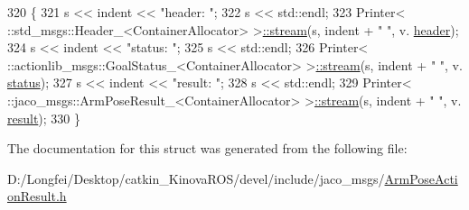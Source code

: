 \begin{DoxyCode}
320   \{
321     s << indent << \textcolor{stringliteral}{"header: "};
322     s << std::endl;
323     Printer< ::std\_msgs::Header\_<ContainerAllocator> >\hyperlink{structros_1_1message__operations_1_1Printer_3_01_1_1jaco__msgs_1_1ArmPoseActionResult___3_01ContainerAllocator_01_4_01_4_a567f70f23cdc780729ce2af5abe4f73f}{::stream}(s, indent + \textcolor{stringliteral}{"  "}, v.
      \hyperlink{structjaco__msgs_1_1ArmPoseActionResult___ad9fc777cd6615aa01e98c2c463ea8cfe}{header});
324     s << indent << \textcolor{stringliteral}{"status: "};
325     s << std::endl;
326     Printer< ::actionlib\_msgs::GoalStatus\_<ContainerAllocator> >\hyperlink{structros_1_1message__operations_1_1Printer_3_01_1_1jaco__msgs_1_1ArmPoseActionResult___3_01ContainerAllocator_01_4_01_4_a567f70f23cdc780729ce2af5abe4f73f}{::stream}(s, indent + \textcolor{stringliteral}{"  "}, v.
      \hyperlink{structjaco__msgs_1_1ArmPoseActionResult___a8c41477e86f3e0e82044b11667eb0e8f}{status});
327     s << indent << \textcolor{stringliteral}{"result: "};
328     s << std::endl;
329     Printer< ::jaco\_msgs::ArmPoseResult\_<ContainerAllocator> >\hyperlink{structros_1_1message__operations_1_1Printer_3_01_1_1jaco__msgs_1_1ArmPoseActionResult___3_01ContainerAllocator_01_4_01_4_a567f70f23cdc780729ce2af5abe4f73f}{::stream}(s, indent + \textcolor{stringliteral}{"  "}, v.
      \hyperlink{structjaco__msgs_1_1ArmPoseActionResult___a9bb1ef2f47899c230eaa740ee2df5b09}{result});
330   \}
\end{DoxyCode}


The documentation for this struct was generated from the following file\+:\begin{DoxyCompactItemize}
\item 
D\+:/\+Longfei/\+Desktop/catkin\+\_\+\+Kinova\+R\+O\+S/devel/include/jaco\+\_\+msgs/\hyperlink{ArmPoseActionResult_8h}{Arm\+Pose\+Action\+Result.\+h}\end{DoxyCompactItemize}
